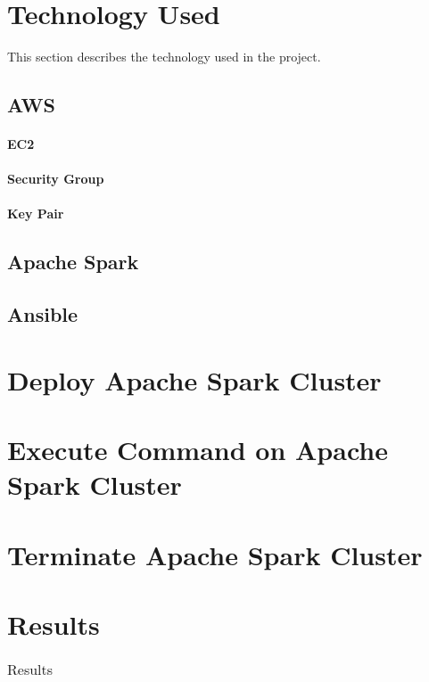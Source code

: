 \section{Technology Used}
This section describes the technology used in the project.

\subsection{AWS}

\paragraph{EC2}

\paragraph{Security Group}

\paragraph{Key Pair}

\subsection{Apache Spark}

\subsection{Ansible}


\section{Deploy Apache Spark Cluster}

\section{Execute Command on Apache Spark Cluster}

\section{Terminate Apache Spark Cluster}

\section{Results}

\begin{table}[hbt]
	\centering
	\caption{Results}\label{t:results-table}
	\begin{tabular}{llll}
	\end{tabular}
\end{table}


